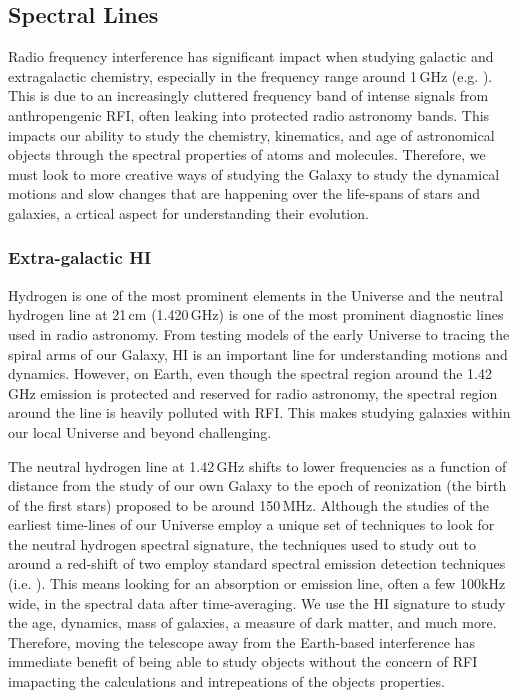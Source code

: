 \subsection{Spectral Lines}
Radio frequency interference has significant impact when studying galactic and extragalactic chemistry, especially in the frequency range around 1\,GHz (e.g. \citealt{Liang_2023}). This is due to an increasingly cluttered frequency band of intense signals from anthropengenic RFI, often leaking into protected radio astronomy bands. This impacts our ability to study the chemistry, kinematics, and age of astronomical objects through the spectral properties of atoms and molecules. Therefore, we must look to more creative ways of studying the Galaxy to study the dynamical motions and slow changes that are happening over the life-spans of stars and galaxies, a crtical aspect for understanding their evolution.

\subsubsection{Extra-galactic HI}
Hydrogen is one of the most prominent elements in the Universe and the neutral hydrogen line at 21\,cm (1.420\,GHz) is one of the most prominent diagnostic lines used in radio astronomy. From testing models of the early Universe to tracing the spiral arms of our Galaxy, H{\sc I} is an important line for understanding motions and dynamics. However, on Earth, even though the spectral region around the 1.42\,GHz emission is protected and reserved for radio astronomy, the spectral region around the line is heavily polluted with RFI. This makes studying galaxies within our local Universe and beyond challenging. 

The neutral hydrogen line at 1.42\,GHz shifts to lower frequencies as a function of distance from the study of our own Galaxy to the epoch of reonization (the birth of the first stars) proposed to be around 150\,MHz. Although the studies of the earliest time-lines of our Universe employ a unique set of techniques to look for the neutral hydrogen spectral signature, the techniques used to study out to around a red-shift of two employ standard spectral emission detection techniques (i.e. \citealt{WALLABY,FLASH}). This means looking for an absorption or emission line, often a few 100kHz wide, in the spectral data after time-averaging. We use the H{\sc I} signature to study the age, dynamics, mass of galaxies, a measure of dark matter, and much more. Therefore, moving the telescope away from the Earth-based interference has immediate benefit of being able to study objects without the concern of RFI imapacting the calculations and intrepeations of the objects properties.

